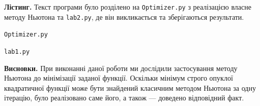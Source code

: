 \documentclass{extreport}
\begin{document}
\noindent\textbf{Лістинг.}
Текст програми було розділено на \texttt{Optimizer.py} з реалізацією
власне методу Ньютона та \texttt{lab2.py}, де він викликається та зберігаються результати.

\noindent\texttt{Optimizer.py}


\noindent\texttt{lab1.py}


\noindent\textbf{Висновки.} При виконанні даної роботи ми дослідили
застосування методу Ньютона до мінімізації заданої функції.
Оскільки мінімум строго опуклої квадратичної функції може бути знайдений класичним методом Ньютона
за одну ітерацію, було реалізовано саме його, а також --- доведено відповідний факт.
\end{document}

